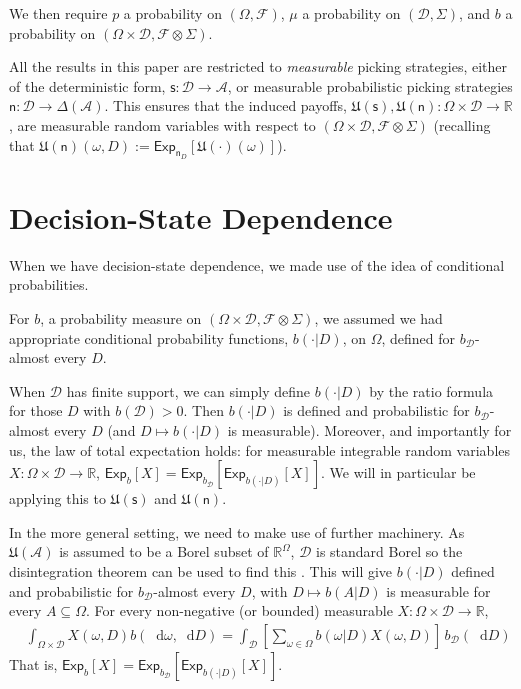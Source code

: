 \documentclass[a4paper]{article}
\newcommand\A{\mathcal{A}}
\newcommand\Exp{\mathsf{Exp}}
\newcommand\U{\mathfrak{U}} %
\newcommand{\Decs}{\mathcal{D}}
\newcommand\s{\mathsf{s}}
\newcommand{\n}{\mathsf{n}}
\renewcommand{\nu}{\n}
\renewcommand{\Re}{\mathbb{R}}
\renewcommand{\color}[1]{}
\newenvironment{colored}[1]{\leavevmode\color{#1}}{}
\newcommand*\diff{\mathop{}\!\mathrm{d}}
\newenvironment{CCM rewritten}
{\begingroup\color{blue}} %
{\endgroup}              %
\begin{document}
\begin{colored}{violet}
	We then require $p$ a probability on $(\Omega,\mathcal{F})$, $\mu$ a probability on $(\Decs,\Sigma)$, and $b$ a probability on $(\Omega\times\Decs,\mathcal{F}\otimes \Sigma)$.

	
	All the results in this paper are restricted to \emph{measurable} picking strategies, either of the deterministic form, $\s:\Decs\to\A$, or measurable probabilistic picking strategies $\n:\Decs\to\Delta(\A)$. This ensures that the induced payoffs, $\U(\s),\U(\n):\Omega\times\Decs\to\Re$, are measurable random variables with respect to $(\Omega\times\Decs,\mathcal{F}\otimes \Sigma)$ (recalling that $\U(\n)(\omega,D):=\Exp_{\n_D}[\U(\cdot)(\omega)]$). 
	

	
	
	
\section{Decision-State Dependence}\label{sect:appendix:decdep}


When we have decision-state dependence, we made use of the idea of conditional probabilities. 

For $b$, a probability measure on $(\Omega\times\Decs,\mathcal{F}\otimes \Sigma)$, we assumed we had appropriate conditional probability functions, $b(\cdot | D)$, on $\Omega$, defined for $b_\Decs$-almost every $D$.

When $\Decs$ has finite support, we can simply define $b(\cdot|D)$ by the ratio formula for those $D$ with $b(\Decs)>0$. 
Then $b(\cdot|D)$ is defined and probabilistic for $b_\Decs$-almost every $D$ (and $D\mapsto b(\cdot|D)$ is measurable). 
Moreover, and importantly for us, the law of total expectation holds: for measurable integrable random variables $X:\Omega\times\Decs\to\Re$, $\Exp_b[X]=\Exp_{b_\Decs}[\Exp_{b(\cdot|D)}[X]]$. We will in particular be applying this to $\U(\s)$ and $\U(\nu)$. 

In the more general setting, we need to make use of further machinery.
As $\U(\A)$ is assumed to be a Borel subset of $\Re^\Omega$, $\Decs$ is standard Borel so the disintegration theorem can be used to find this \citep[Theorem 3.4]{kallenberg1997foundations}. 
This will give $b(\cdot|D)$ defined and probabilistic for $b_\Decs$-almost every $D$, with $D\mapsto b(A|D)$ is measurable for every $A\subseteq\Omega$. 
For every non-negative (or bounded) measurable $X:\Omega\times\Decs\to\Re$, \begin{align}
	&\int_{\Omega\times \Decs} X(\omega,D) b(\diff \omega, \diff D)=\int_\Decs \left[\sum_{\omega\in\Omega} b(\omega|D)X(\omega,D)\right]\,b_\Decs(\diff D)
\end{align}
That is, $\Exp_b[X]=\Exp_{b_\Decs}[\Exp_{b(\cdot|D)}[X]]$.


\end{colored}
\end{document}
